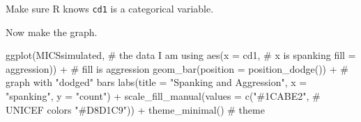 \documentclass[
  letterpaper,
  DIV=11,
  numbers=noendperiod]{scrreprt}
\newenvironment{Shaded}{\begin{snugshade}}{\end{snugshade}}
\newcommand{\AttributeTok}[1]{\textcolor[rgb]{0.40,0.45,0.13}{#1}}
\newcommand{\CommentTok}[1]{\textcolor[rgb]{0.37,0.37,0.37}{#1}}
\newcommand{\ConstantTok}[1]{\textcolor[rgb]{0.56,0.35,0.01}{#1}}
\newcommand{\DecValTok}[1]{\textcolor[rgb]{0.68,0.00,0.00}{#1}}
\newcommand{\FunctionTok}[1]{\textcolor[rgb]{0.28,0.35,0.67}{#1}}
\newcommand{\NormalTok}[1]{\textcolor[rgb]{0.00,0.23,0.31}{#1}}
\newcommand{\OtherTok}[1]{\textcolor[rgb]{0.00,0.23,0.31}{#1}}
\newcommand{\SpecialCharTok}[1]{\textcolor[rgb]{0.37,0.37,0.37}{#1}}
\newcommand{\StringTok}[1]{\textcolor[rgb]{0.13,0.47,0.30}{#1}}
\begin{document}
Make sure R knows \texttt{cd1} is a categorical variable.

\begin{Shaded}
\end{Shaded}

Now make the graph.

\begin{Shaded}
\begin{Highlighting}[]
\FunctionTok{ggplot}\NormalTok{(MICSsimulated, }\CommentTok{\# the data I am using}
       \FunctionTok{aes}\NormalTok{(}\AttributeTok{x =}\NormalTok{ cd1, }\CommentTok{\# x is spanking}
           \AttributeTok{fill =}\NormalTok{ aggression)) }\SpecialCharTok{+} \CommentTok{\# fill is aggression}
  \FunctionTok{geom\_bar}\NormalTok{(}\AttributeTok{position =} \FunctionTok{position\_dodge}\NormalTok{()) }\SpecialCharTok{+} \CommentTok{\# graph with "dodged" bars}
  \FunctionTok{labs}\NormalTok{(}\AttributeTok{title =} \StringTok{"Spanking and Aggression"}\NormalTok{, }
       \AttributeTok{x =} \StringTok{"spanking"}\NormalTok{, }
       \AttributeTok{y =} \StringTok{"count"}\NormalTok{) }\SpecialCharTok{+}
  \FunctionTok{scale\_fill\_manual}\NormalTok{(}\AttributeTok{values =} \FunctionTok{c}\NormalTok{(}\StringTok{"\#1CABE2"}\NormalTok{, }\CommentTok{\# UNICEF colors}
                               \StringTok{"\#D8D1C9"}\NormalTok{)) }\SpecialCharTok{+}
  \FunctionTok{theme\_minimal}\NormalTok{()  }\CommentTok{\# theme}
\end{Highlighting}
\end{Shaded}
\end{document}
